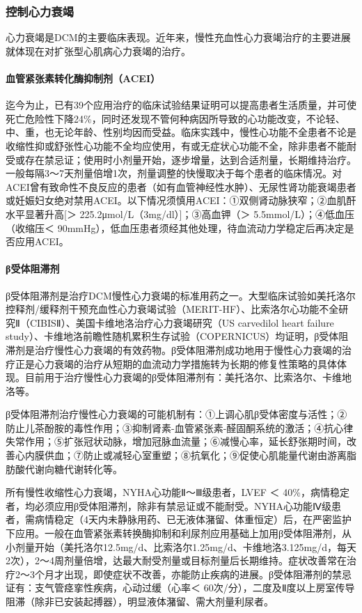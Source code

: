 \subsubsection{控制心力衰竭}

心力衰竭是DCM的主要临床表现。近年来，慢性充血性心力衰竭治疗的主要进展就体现在对扩张型心肌病心力衰竭的治疗。

\paragraph{血管紧张素转化酶抑制剂（ACEI）}

迄今为止，已有39个应用治疗的临床试验结果证明可以提高患者生活质量，并可使死亡危险性下降24\%，同时还发现不管何种病因所导致的心功能改变，不论轻、中、重，也无论年龄、性别均因而受益。临床实践中，慢性心功能不全患者不论是收缩性抑或舒张性心功能不全均应使用，有或无症状心功能不全，除非患者不能耐受或存在禁忌证；使用时小剂量开始，逐步增量，达到合适剂量，长期维持治疗。一般每隔3～7天剂量倍增1次，剂量调整的快慢取决于每个患者的临床情况。对ACEI曾有致命性不良反应的患者（如有血管神经性水肿）、无尿性肾功能衰竭患者或妊娠妇女绝对禁用ACEI。以下情况须慎用ACEI：①双侧肾动脉狭窄；②血肌酐水平显著升高{[}＞
225.2μmol/L（3mg/dl）{]}；③高血钾（＞ 5.5mmol/L）；④低血压（收缩压＜
90mmHg），低血压患者须经其他处理，待血流动力学稳定后再决定是否应用ACEI。

\paragraph{β受体阻滞剂}

β受体阻滞剂是治疗DCM慢性心力衰竭的标准用药之一。大型临床试验如美托洛尔控释剂/缓释剂干预充血性心力衰竭试验（MERIT-HF）、比索洛尔心功能不全研究Ⅱ（CIBISⅡ）、美国卡维地洛治疗心力衰竭研究（US
carvedilol heart failure
study）、卡维地洛前瞻性随机累积生存试验（COPERNICUS）均证明，β受体阻滞剂是治疗慢性心力衰竭的有效药物。β受体阻滞剂成功地用于慢性心力衰竭的治疗正是心力衰竭的治疗从短期的血流动力学措施转为长期的修复性策略的具体体现。目前用于治疗慢性心力衰竭的β受体阻滞剂有：美托洛尔、比索洛尔、卡维地洛等。

β受体阻滞剂治疗慢性心力衰竭的可能机制有：①上调心肌β受体密度与活性；②防止儿茶酚胺的毒性作用；③抑制肾素-血管紧张素-醛固酮系统的激活；④抗心律失常作用；⑤扩张冠状动脉，增加冠脉血流量；⑥减慢心率，延长舒张期时间，改善心内膜供血；⑦防止或减轻心室重塑；⑧抗氧化；⑨促使心肌能量代谢由游离脂肪酸代谢向糖代谢转化等。

所有慢性收缩性心力衰竭，NYHA心功能Ⅱ～Ⅲ级患者，LVEF ＜
40\%，病情稳定者，均必须应用β受体阻滞剂，除非有禁忌证或不能耐受。NYHA心功能Ⅳ级患者，需病情稳定（4天内未静脉用药、已无液体潴留、体重恒定）后，在严密监护下应用。一般在血管紧张素转换酶抑制和利尿剂应用基础上加用β受体阻滞剂，从小剂量开始（美托洛尔12.5mg/d、比索洛尔1.25mg/d、卡维地洛3.125mg/d，每天2次），2～4周剂量倍增，达最大耐受剂量或目标剂量后长期维持。症状改善常在治疗2～3个月才出现，即使症状不改善，亦能防止疾病的进展。β受体阻滞剂的禁忌证有：支气管痉挛性疾病，心动过缓（心率＜
60次/分），二度及Ⅱ度以上房室传导阻滞（除非已安装起搏器），明显液体潴留、需大剂量利尿者。

